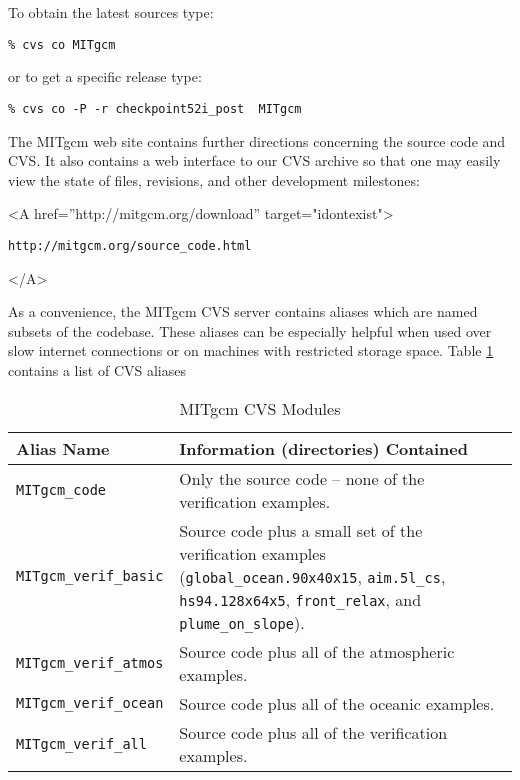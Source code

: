 To obtain the latest sources type:
\begin{verbatim}
% cvs co MITgcm
\end{verbatim}
or to get a specific release type:
\begin{verbatim}
% cvs co -P -r checkpoint52i_post  MITgcm
\end{verbatim}
The MITgcm web site contains further directions concerning the source
code and CVS.  It also contains a web interface to our CVS archive so
that one may easily view the state of files, revisions, and other
development milestones:
\begin{rawhtml} <A href=''http://mitgcm.org/download'' target="idontexist"> \end{rawhtml}
\begin{verbatim}
http://mitgcm.org/source_code.html
\end{verbatim}
\begin{rawhtml} </A> \end{rawhtml}

As a convenience, the MITgcm CVS server contains aliases which are
named subsets of the codebase.  These aliases can be especially
helpful when used over slow internet connections or on machines with
restricted storage space.  Table \ref{tab:cvsModules} contains a list
of CVS aliases
\begin{table}[htb]
  \centering
  \begin{tabular}[htb]{|lp{3.25in}|}\hline
    \textbf{Alias Name}    &  \textbf{Information (directories) Contained}  \\\hline
    \texttt{MITgcm\_code}  &  Only the source code -- none of the verification examples.  \\
    \texttt{MITgcm\_verif\_basic}
    &  Source code plus a small set of the verification examples 
    (\texttt{global\_ocean.90x40x15}, \texttt{aim.5l\_cs}, \texttt{hs94.128x64x5}, 
    \texttt{front\_relax}, and \texttt{plume\_on\_slope}).  \\
    \texttt{MITgcm\_verif\_atmos}  &  Source code plus all of the atmospheric examples.  \\
    \texttt{MITgcm\_verif\_ocean}  &  Source code plus all of the oceanic examples.  \\
    \texttt{MITgcm\_verif\_all}    &  Source code plus all of the
    verification examples. \\\hline
  \end{tabular}
  \caption{MITgcm CVS Modules}
  \label{tab:cvsModules}
\end{table}

